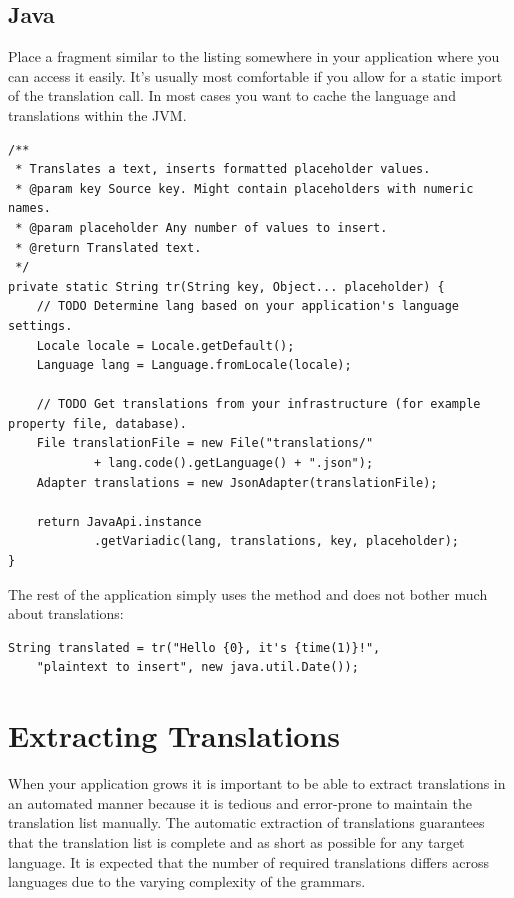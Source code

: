 \documentclass[a4paper,11pt,twoside]{report}
\begin{document}
\subsection{Java}\label{sec:java-translation-function}
Place a fragment similar to the listing somewhere in your application where you can access it easily. It's usually most comfortable if you allow for a static import of the translation call. In most cases you want to cache the language and translations within the JVM.
\begin{lstlisting}
/**
 * Translates a text, inserts formatted placeholder values.
 * @param key Source key. Might contain placeholders with numeric names.
 * @param placeholder Any number of values to insert.
 * @return Translated text.
 */
private static String tr(String key, Object... placeholder) {
	// TODO Determine lang based on your application's language settings.
	Locale locale = Locale.getDefault();
	Language lang = Language.fromLocale(locale);

	// TODO Get translations from your infrastructure (for example property file, database).
	File translationFile = new File("translations/"
			+ lang.code().getLanguage() + ".json");
	Adapter translations = new JsonAdapter(translationFile);

	return JavaApi.instance
			.getVariadic(lang, translations, key, placeholder);
}
\end{lstlisting}
The rest of the application simply uses the method and does not bother much about translations:
\begin{lstlisting}
String translated = tr("Hello {0}, it's {time(1)}!",
	"plaintext to insert", new java.util.Date());
\end{lstlisting}

\section{Extracting Translations}
When your application grows it is important to be able to extract translations in an automated manner because it is tedious and error-prone to maintain the translation list manually. The automatic extraction of translations guarantees that the translation list is complete and as short as possible for any target language. It is expected that the number of required translations differs across languages due to the varying complexity of the grammars.
\end{document}
